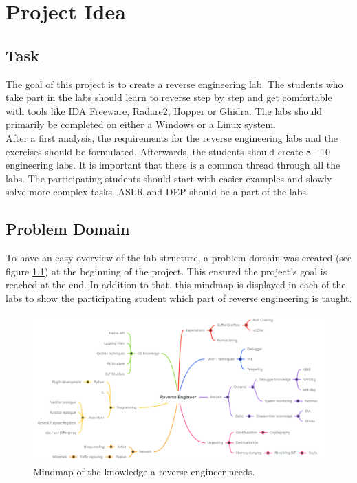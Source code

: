 \chapter{Project Idea}
\section{Task}
\label{sec:task}
The goal of this project is to create a reverse engineering lab. The students who take part in the labs should learn to reverse step by step and get comfortable with tools like IDA Freeware, Radare2, Hopper or Ghidra. The labs should primarily be completed on either a Windows or a Linux system. \\
After a first analysis, the requirements for the reverse engineering labs and the exercises should be formulated. Afterwards, the students should create 8 - 10 engineering labs. It is important that there is a common thread through all the labs. The participating students should start with easier examples and slowly solve more complex tasks. ASLR and DEP should be a part of the labs.

\section{Problem Domain}
\label{sec:problem-domain}
To have an easy overview of the lab structure, a problem domain was created (see figure \ref{fig:mindmap}) at the beginning of the project. This ensured the project's goal is reached at the end. In addition to that, this mindmap is displayed in each of the labs to show the participating student which part of reverse engineering is taught.
\begin{figure}[H]
    \includegraphics[width=\linewidth, center]{resources/RE_Domain_Light.png}
    \caption{Mindmap of the knowledge a reverse engineer needs.}
    \label{fig:mindmap}
\end{figure}

